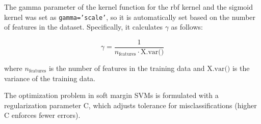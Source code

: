 The gamma parameter of the kernel function for the rbf kernel and the sigmoid kernel was set as \texttt{gamma='scale'}, so it is automatically set based on the number of features in the dataset. Specifically, it calculates $\gamma$ as follows:

$$
\gamma = \frac{1}{n_{\text{features}} \cdot \text{X.var()}}
$$

where $n_{\text{features}}$ is the number of features in the training data and $\text{X.var()}$ is the variance of the training data.
\newline 

The optimization problem in soft margin SVMs is formulated with a regularization parameter C, which adjusts tolerance for misclassifications (higher C enforces fewer errors).

